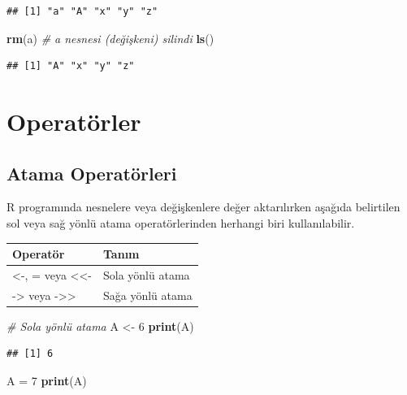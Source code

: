 \documentclass[
]{book}
\newenvironment{Shaded}{\begin{snugshade}}{\end{snugshade}}
\newcommand{\CommentTok}[1]{\textcolor[rgb]{0.56,0.35,0.01}{\textit{#1}}}
\newcommand{\DecValTok}[1]{\textcolor[rgb]{0.00,0.00,0.81}{#1}}
\newcommand{\FunctionTok}[1]{\textcolor[rgb]{0.13,0.29,0.53}{\textbf{#1}}}
\newcommand{\NormalTok}[1]{#1}
\newcommand{\OtherTok}[1]{\textcolor[rgb]{0.56,0.35,0.01}{#1}}
\begin{document}
\begin{verbatim}
## [1] "a" "A" "x" "y" "z"
\end{verbatim}

\begin{Shaded}
\begin{Highlighting}[]
\FunctionTok{rm}\NormalTok{(a)}
\CommentTok{\# a nesnesi (değişkeni) silindi}
\FunctionTok{ls}\NormalTok{()}
\end{Highlighting}
\end{Shaded}

\begin{verbatim}
## [1] "A" "x" "y" "z"
\end{verbatim}

\section{Operatörler}\label{operatuxf6rler}

\subsection{Atama Operatörleri}\label{atama-operatuxf6rleri}

R programında nesnelere veya değişkenlere değer aktarılırken aşağıda belirtilen sol veya sağ yönlü atama operatörlerinden herhangi biri kullanılabilir.

\begin{tabular}{ll}
\toprule
Operatör & Tanım\\
\midrule
<-, = veya <<- & Sola yönlü atama\\
-> veya ->> & Sağa yönlü atama\\
\bottomrule
\end{tabular}

\begin{Shaded}
\begin{Highlighting}[]
\CommentTok{\# Sola yönlü atama}
\NormalTok{A }\OtherTok{\textless{}{-}} \DecValTok{6}
\FunctionTok{print}\NormalTok{(A)}
\end{Highlighting}
\end{Shaded}

\begin{verbatim}
## [1] 6
\end{verbatim}

\begin{Shaded}
\begin{Highlighting}[]
\NormalTok{A }\OtherTok{=} \DecValTok{7}
\FunctionTok{print}\NormalTok{(A)}
\end{Highlighting}
\end{Shaded}
\end{document}
